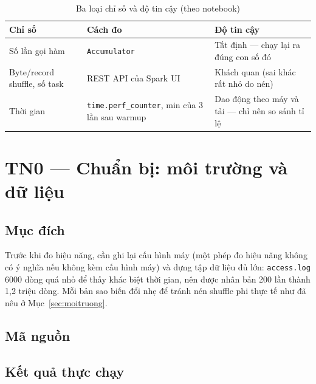 \documentclass[12pt,a4paper,oneside]{article}
\begin{document}
\begin{table}[H]
\centering
\caption{Ba loại chỉ số và độ tin cậy (theo notebook)}
\label{tab:do}
\begin{tabularx}{\textwidth}{l l X}
\toprule
Chỉ số & Cách đo & Độ tin cậy \\
\midrule
Số lần gọi hàm & \texttt{Accumulator} & Tất định --- chạy lại ra đúng con số đó \\
Byte/record shuffle, số task & REST API của Spark UI & Khách quan (sai khác rất nhỏ do nén) \\
Thời gian & \texttt{time.perf\_counter}, min của 3 lần sau warmup & Dao động theo máy và tải --- chỉ nên so sánh tỉ lệ \\
\bottomrule
\end{tabularx}
\end{table}

\section{TN0 --- Chuẩn bị: môi trường và dữ liệu}
\label{sec:tn0}

\subsection{Mục đích}

Trước khi đo hiệu năng, cần ghi lại cấu hình máy (một phép đo hiệu năng không có ý nghĩa nếu không kèm cấu hình máy) và dựng tập dữ liệu đủ lớn: \texttt{access.log} 6000 dòng quá nhỏ để thấy khác biệt thời gian, nên được nhân bản 200 lần thành 1,2 triệu dòng. Mỗi bản sao biến đổi nhẹ để tránh nén shuffle phi thực tế như đã nêu ở Mục~\ref{sec:moitruong}.

\subsection{Mã nguồn}



\subsection{Kết quả thực chạy}


\end{document}
